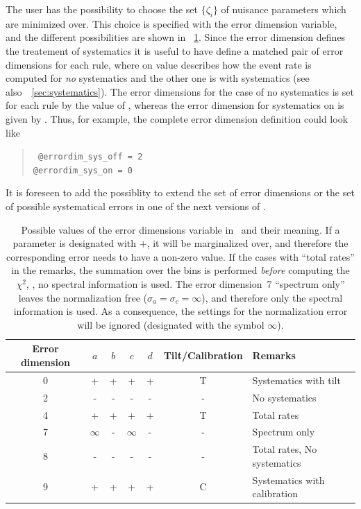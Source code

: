 The user has the possibility to choose the set $\{\zeta_i\}$ of nuisance 
parameters which are minimized over. This choice is specified with the 
error dimension variable, and the different 
possibilities are shown in
\Tab~\ref{tab:error_dim}. Since the error dimension defines the treatement
of systematics it is useful to have define a matched pair of error dimensions
for each rule, where on value describes how the event rate is computed
for \emph{no} systematics and the other one is with systematics 
(see also~\Sec~\ref{sec:systematics}).
The error dimensions for the case of no systematics is set for each rule 
by the value of , whereas the error dimension
for systematics on is given by . Thus, for example,
the complete error dimension definition could look like  
\begin{quote}
{\tt 
\tb @errordim\_sys\_off = 2\\
\tb @errordim\_sys\_on = 0
}
\end{quote}
It is foreseen to add the possiblity to extend the set 
of error dimensions or the set of possible systematical errors in one
of the next versions of \GLOBES.
\begin{center}
\begin{table}[t!]
\begin{center}
\begin{tabular}[h]{|c|cccc|c|l|}
\hline
Error dimension&$a$&$b$&$c$&$d$&Tilt/Calibration&Remarks\\
\hline
\hline
0&+&+&+&+&T&Systematics with tilt\\
2&-&-&-&-&-&No systematics\\
4&+&+&+&+&T&Total rates\\
7& $\infty$ &-& $\infty$ &-&-&Spectrum only\\
8&-&-&-&-&-&Total rates, No systematics\\
9&+&+&+&+&C&Systematics with calibration\\
\hline
\end{tabular}
\caption[Table of error dimensions]{\label{tab:error_dim}
Possible values of the error dimensions variable in \GLOBES\ and their meaning. If a parameter is designated with $+$, it will
be marginalized over, and therefore the corresponding error needs to 
have a non-zero value. If the cases with ``total rates'' in the remarks, 
the summation over the bins is performed \emph{before} computing 
the $\chi^2$, \ie, no spectral information is used. 
The error dimension~7 ``spectrum only'' leaves the 
normalization free ($\sigma_a=\sigma_c=\infty$), and therefore 
only the spectral information is used. As a consequence,
the settings for the normalization error will be ignored (designated 
with the symbol $\infty$). 
 }
\end{center} 
\end{table} 
\end{center}


